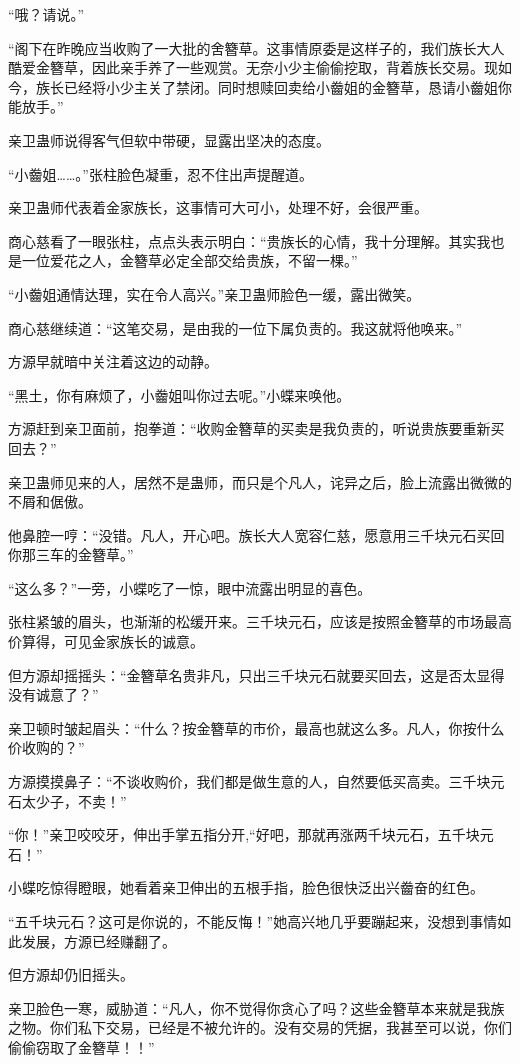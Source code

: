 \begin{this_body}
“哦？请说。”

“阁下在昨晚应当收购了一大批的舍簪草。这事情原委是这样子的，我们族长大人酷爱金簪草，因此亲手养了一些观赏。无奈小少主偷偷挖取，背着族长交易。现如今，族长已经将小少主关了禁闭。同时想赎回卖给小齤姐的金簪草，恳请小齤姐你能放手。”

亲卫蛊师说得客气但软中带硬，显露出坚决的态度。

“小齤姐……。”张柱脸色凝重，忍不住出声提醒道。

亲卫蛊师代表着金家族长，这事情可大可小，处理不好，会很严重。

商心慈看了一眼张柱，点点头表示明白：“贵族长的心情，我十分理解。其实我也是一位爱花之人，金簪草必定全部交给贵族，不留一棵。”

“小齤姐通情达理，实在令人高兴。”亲卫蛊师脸色一缓，露出微笑。

商心慈继续道：“这笔交易，是由我的一位下属负责的。我这就将他唤来。”

方源早就暗中关注着这边的动静。

“黑土，你有麻烦了，小齤姐叫你过去呢。”小蝶来唤他。

方源赶到亲卫面前，抱拳道：“收购金簪草的买卖是我负责的，听说贵族要重新买回去？”

亲卫蛊师见来的人，居然不是蛊师，而只是个凡人，诧异之后，脸上流露出微微的不屑和倨傲。

他鼻腔一哼：“没错。凡人，开心吧。族长大人宽容仁慈，愿意用三千块元石买回你那三车的金簪草。”

“这么多？”一旁，小蝶吃了一惊，眼中流露出明显的喜色。

张柱紧皱的眉头，也渐渐的松缓开来。三千块元石，应该是按照金簪草的市场最高价算得，可见金家族长的诚意。

但方源却摇摇头：“金簪草名贵非凡，只出三千块元石就要买回去，这是否太显得没有诚意了？”

亲卫顿时皱起眉头：“什么？按金簪草的市价，最高也就这么多。凡人，你按什么价收购的？”

方源摸摸鼻子：“不谈收购价，我们都是做生意的人，自然要低买高卖。三千块元石太少子，不卖！”

“你！”亲卫咬咬牙，伸出手掌五指分开,“好吧，那就再涨两千块元石，五千块元石！”

小蝶吃惊得瞪眼，她看着亲卫伸出的五根手指，脸色很快泛出兴齤奋的红色。

“五千块元石？这可是你说的，不能反悔！”她高兴地几乎要蹦起来，没想到事情如此发展，方源已经赚翻了。

但方源却仍旧摇头。

亲卫脸色一寒，威胁道：“凡人，你不觉得你贪心了吗？这些金簪草本来就是我族之物。你们私下交易，已经是不被允许的。没有交易的凭据，我甚至可以说，你们偷偷窃取了金簪草！！”


\end{this_body}
